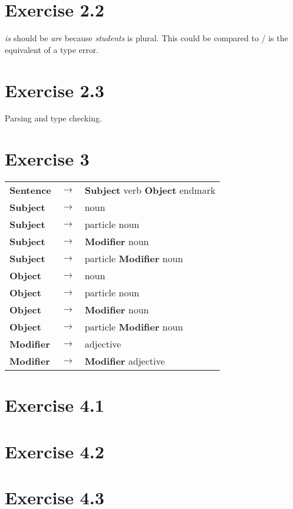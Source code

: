 \documentclass[11pt]{article} %
\begin{document}
\section*{Exercise 2.2}
\textit{is} should be \textit{are} because \textit{students} is plural. This could be compared to / is the equivalent
of a type error.

\section*{Exercise 2.3}
Parsing and type checking.

\section*{Exercise 3}
\begin{tabular}{lcl}
\textbf{Sentence}		& $\rightarrow$	& \textbf{Subject} verb \textbf{Object} endmark		\\
\textbf{Subject}		& $\rightarrow$	& noun												\\
\textbf{Subject}		& $\rightarrow$	& particle noun										\\
\textbf{Subject}		& $\rightarrow$	& \textbf{Modifier} noun							\\
\textbf{Subject}		& $\rightarrow$	& particle \textbf{Modifier} noun					\\
\textbf{Object}			& $\rightarrow$	& noun												\\
\textbf{Object}			& $\rightarrow$	& particle noun										\\
\textbf{Object}			& $\rightarrow$	& \textbf{Modifier} noun							\\
\textbf{Object}			& $\rightarrow$	& particle \textbf{Modifier} noun					\\
\textbf{Modifier}		& $\rightarrow$	& adjective											\\
\textbf{Modifier}		& $\rightarrow$	& \textbf{Modifier} adjective						\\
\end{tabular}

\section*{Exercise 4.1}

\section*{Exercise 4.2}

\section*{Exercise 4.3}
\end{document}
